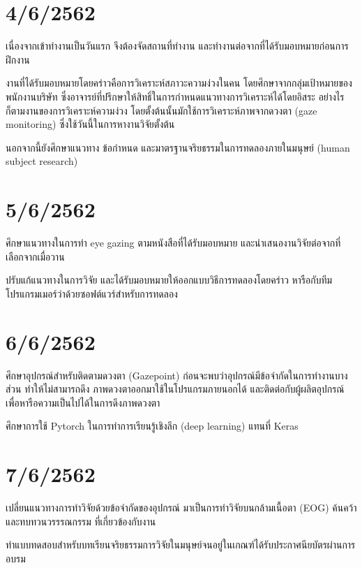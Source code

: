 \section*{4/6/2562}

เนื่องจากเข้าทำงานเป็นวันแรก จึงต้องจัดสถานที่ทำงาน และทำงานต่อจากที่ได้รับมอบหมายก่อนการฝึกงาน

งานที่ได้รับมอบหมายโดยคร่าวคือการวิเคราะห์สภาวะความง่วงในคน โดยศึกษาจากกลุ่มเป้าหมายของพนักงานบริษัท
ซึ่งอาจารย์ที่ปรึกษาให้สิทธิ์ในการกำหนดแนวทางการวิเคราะห์ได้โดยอิสระ อย่างไรก็ตามงานของการวิเคราะห์ความง่วง
โดยตั้งต้นนั้นมักใช้การวิเคราะห์ภาพจากดวงตา (gaze monitoring) ซึ่งใช้วันนี้ในการหางานวิจัยตั้งต้น

นอกจากนี้ยังศึกษาแนวทาง ข้อกำหนด และมาตรฐานจริยธรรมในการทดลองภายในมนุษย์ (human subject research)

\section*{5/6/2562}

ศึกษาแนวทางในการทำ eye gazing ตามหนังสือที่ได้รับมอบหมาย และนำเสนองานวิจัยต่อจากที่เลือกจากเมื่อวาน

ปรับแก้แนวทางในการวิจัย และได้รับมอบหมายให้ออกแบบวิธีการทดลองโดยคร่าว
หารือกับทีมโปรแกรมเมอร์ว่าด้วยซอฟต์แวร์สำหรับการทดลอง

\section*{6/6/2562}

ศึกษาอุปกรณ์สำหรับติดตามดวงตา (Gazepoint) ก่อนจะพบว่าอุปกรณ์มีข้อจำกัดในการทำงานบางส่วน ทำให้ไม่สามารถดึง
ภาพดวงตาออกมาใช้ในโปรแกรมภายนอกได้ และติดต่อกับผู้ผลิตอุปกรณ์เพื่อหารือความเป็นไปได้ในการดึงภาพดวงตา

ศึกษาการใช้ Pytorch ในการทำการเรียนรู้เชิงลึก (deep learning) แทนที่ Keras

\section*{7/6/2562}

เปลี่ยนแนวทางการทำวิจัยด้วยข้อจำกัดของอุปกรณ์ มาเป็นการทำวิจัยบนกล้ามเนื้อตา (EOG) ค้นคว้าและทบทวนวรรรณกรรม
ที่เกี่ยวข้องกับงาน

ทำแบบทดสอบสำหรับบทเรียนจริยธรรมการวิจัยในมนุษย์จนอยู่ในเกณฑ์ได้รับประกาศนียบัตรผ่านการอบรม